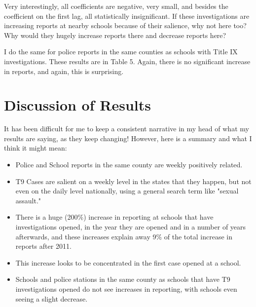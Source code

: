 \documentclass[AER]{AEA}
\begin{document}
Very interestingly, all coefficients are negative, very small, and besides the coefficient on the first lag, all statistically insignificant. If these investigations are increasing reports at nearby schools because of their salience, why not here too? Why would they hugely increase reports there and decrease reports here?

I do the same for police reports in the same counties as schools with Title IX investigations. These results are in Table 5. Again, there is no significant increase in reports, and again, this is surprising. 

\section{Discussion of Results}

It has been difficult for me to keep a consistent narrative in my head of what my results are saying, as they keep changing! However, here is a summary and what I think it might mean:

\begin{itemize}
    \item Police and School reports in the same county are weekly positively related.
    \item T9 Cases are salient on a weekly level in the states that they happen, but not even on the daily level nationally, using a general search term like "sexual assault." 
    \item There is a huge (200\%) increase in reporting at schools that have investigations opened, in the year they are opened and in a number of years afterwards, and these increases explain away 9\% of the total increase in reports after 2011.
    \item This increase looks to be concentrated in the first case opened at a school.
    \item Schools and police stations in the same county as schools that have T9 investigations opened do not see increases in reporting, with schools even seeing a slight decrease.
\end{itemize}
\end{document}
